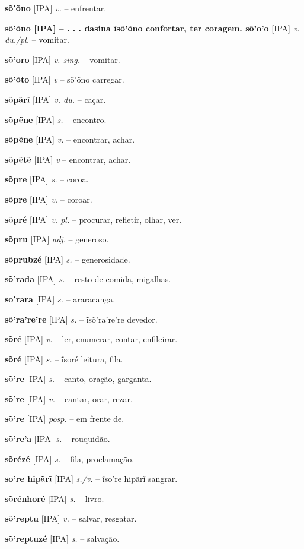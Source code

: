 \textbf{sõ'õno} [IPA] \textit{v.} -- enfrentar.

\textbf{sõ'õno [IPA]  -- . . . dasina ĩsõ'õno confortar, ter coragem. sõ'o'o} [IPA] \textit{v. du./pl.} -- vomitar.

\textbf{sõ'oro} [IPA] \textit{v. sing.} -- vomitar.

\textbf{sõ'õto} [IPA] \textit{v} -- sõ'õno carregar.

\textbf{sõpãrĩ} [IPA] \textit{v. du.} -- caçar.

\textbf{sõpẽne} [IPA] \textit{s.} -- encontro.

\textbf{sõpẽne} [IPA] \textit{v.} -- encontrar, achar.

\textbf{sõpẽtẽ} [IPA] \textit{v} -- encontrar, achar.

\textbf{sõpre} [IPA] \textit{s.} -- coroa.

\textbf{sõpre} [IPA] \textit{v.} -- coroar.

\textbf{sõpré} [IPA] \textit{v. pl.} -- procurar, refletir, olhar, ver.

\textbf{sõpru} [IPA] \textit{adj.} -- generoso.

\textbf{sõprubzé} [IPA] \textit{s.} -- generosidade.

\textbf{sõ'rada} [IPA] \textit{s.} -- resto de comida, migalhas.

\textbf{so'rara} [IPA] \textit{s.} -- araracanga.

\textbf{sõ'ra're're} [IPA] \textit{s.} -- ĩsõ'ra're're devedor.

\textbf{sõré} [IPA] \textit{v.} -- ler, enumerar, contar, enfileirar.

\textbf{sõré} [IPA] \textit{s.} -- ĩsoré leitura, fila.

\textbf{sõ're} [IPA] \textit{s.} -- canto, oração, garganta.

\textbf{sõ're} [IPA] \textit{v.} -- cantar, orar, rezar.

\textbf{sõ're} [IPA] \textit{posp.} -- em frente de.

\textbf{sõ're'a} [IPA] \textit{s.} -- rouquidão.

\textbf{sõrézé} [IPA] \textit{s.} -- fila, proclamação.

\textbf{so're hipãrĩ} [IPA] \textit{s./v.} -- ĩso're hipãrĩ sangrar.

\textbf{sõrénhoré} [IPA] \textit{s.} -- livro.

\textbf{sõ'reptu} [IPA] \textit{v.} -- salvar, resgatar.

\textbf{sõ'reptuzé} [IPA] \textit{s.} -- salvação.

